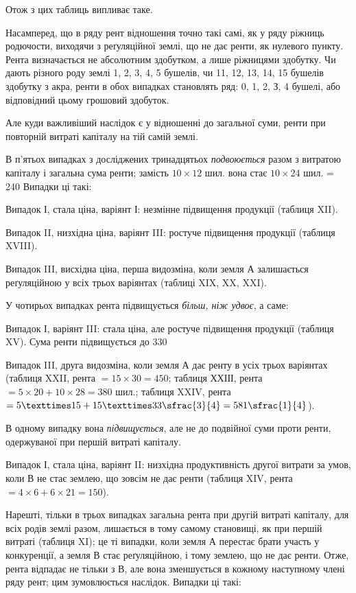 

Отож з цих таблиць випливає таке.

Насамперед, що в ряду рент відношення точно такі самі, як у ряду ріжниць
родючости, виходячи з реґуляційної землі, що не дає ренти, як нулевого
пункту. Рента визначається не абсолютним здобутком, а лише ріжницями здобутку.
Чи дають різного роду землі 1, 2, 3, 4, 5 бушелів, чи 11, 12, 13, 14,
15 бушелів здобутку з акра, ренти в обох випадках становлять ряд: 0, 1, 2,
З, 4 бушелі, або відповідний цьому грошовий здобуток.

Але куди важливіший наслідок є у відношенні до загальної суми, ренти
при повторній витраті капіталу на тій самій землі.

В п’ятьох випадках з досліджених тринадцятьох \emph{подвоюється} разом з витратою
капіталу і загальна сума ренти; замість $10 × 12$ шил. вона стає
$10 × 24$ шил. = 240 Випадки ці такі:

Випадок І, стала ціна, варіянт І: незмінне підвищення продукції (таблиця
XII).

Випадок II, низхідна ціна, варіянт III: ростуче підвищення продукції
(таблиця XVIII).

Випадок III, висхідна ціна, перша видозміна, коли земля $А$ залишається
реґуляційною у всіх трьох варіянтах (таблиці XIX, XX, XXI).

У чотирьох випадках рента підвищується \emph{більш, ніж удвоє}, а саме:

Випадок І, варіянт III: стала ціна, але ростуче підвищення продукції
(таблиця XV). Сума ренти підвищується до 330

Випадок III, друга видозміна, коли земля $А$ дає ренту в усіх трьох варіянтах
(таблиця XXII, рента $= 15 × 30 = 450$; таблиця ХХІІІ, рента $= 5 ×
20 + 10 × 28 = 380$ шил.; таблиця XXIV, рента
$= 5 × 15 + 15 × 33\sfrac{3}{4} = 581\sfrac{1}{4}$).

В одному випадку вона \emph{підвищується}, але не до подвійної суми проти
ренти, одержуваної при першій витраті капіталу.

Випадок І, стала ціна, варіянт II: низхідна продуктивність другої витрати
за умов, коли $В$ не стає землею, що зовсім не дає ренти (таблиця XIV, рента
$= 4 × 6 + 6 × 21 = 150$).

Нарешті, тільки в трьох випадках загальна рента при другій витраті
капіталу, для всіх родів землі разом, лишається в тому самому становищі, як при
першій витраті (таблиця XI); це ті випадки, коли земля $А$ перестає брати участь
у конкуренції, а земля $В$ стає реґуляційною, і тому землею, що не дає ренти.
Отже, рента відпадає не тільки з $В$, але вона зменшується в кожному наступному
члені ряду рент; цим зумовлюється наслідок. Випадки ці такі:

